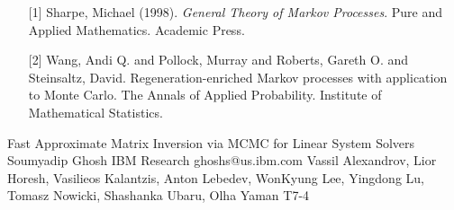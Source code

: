 \begin{talk}
\medskip

\begin{enumerate}
	\item[{[1]}] Sharpe, Michael (1998). {\it General Theory of Markov Processes}. Pure and Applied Mathematics. Academic Press.
	\item[{[2]}] Wang, Andi Q. and Pollock, Murray and Roberts, Gareth O. and Steinsaltz, David. Regeneration-enriched Markov processes with application to Monte Carlo. The Annals of Applied Probability. Institute of Mathematical Statistics.
\end{enumerate}

\end{talk}

\begin{talk}
  {Fast Approximate Matrix Inversion via MCMC for Linear System Solvers}%
  {Soumyadip Ghosh}%
  {IBM Research}%
  {ghoshs@us.ibm.com}%
  {Vassil Alexandrov, Lior Horesh, Vasilieos Kalantzis, Anton Lebedev,  WonKyung Lee, Yingdong Lu, Tomasz Nowicki, Shashanka Ubaru, Olha Yaman}%
  {T7-4}%
			

\end{talk}
